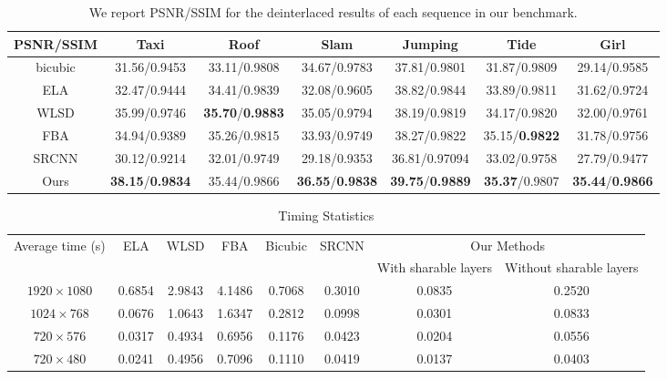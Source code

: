 \begin{table*}
	\center
	\begin{tabular}{|c|c|c|c|c|c|c|}
		\hline
		PSNR/SSIM & Taxi         & Roof & Slam & Jumping      & Tide  &   Girl \\\hline
		bicubic & 31.56/0.9453          & 33.11/0.9808      &34.67/0.9783          &37.81/0.9801    		 &31.87/0.9809                   & 29.14/0.9585  \\  \hline
		ELA     & 32.47/0.9444          & 34.41/0.9839      &32.08/0.9605             &38.82/0.9844             &33.89/0.9811                 & 31.62/0.9724  \\ \hline
		WLSD    & 35.99/0.9746          & \textbf{35.70}/\textbf{0.9883}      &35.05/0.9794    &38.19/0.9819             &34.17/0.9820                 & 32.00/0.9761 \\ \hline
		FBA     & 34.94/0.9389          & 35.26/0.9815      &33.93/0.9749             &38.27/0.9822             &35.15/\textbf{0.9822}                 & 31.78/0.9756  \\ \hline
		SRCNN   & 30.12/0.9214          & 32.01/0.9749      &29.18/0.9353             &36.81/0.97094             &33.02/0.9758                 & 27.79/0.9477  \\ \hline
		Ours    &\textbf{38.15}/\textbf{0.9834}  & 35.44/0.9866   & \textbf{36.55}/\textbf{0.9838}         &\textbf{39.75}/\textbf{0.9889}    &\textbf{35.37}/0.9807      & \textbf{35.44}/\textbf{0.9866} \\ \hline
	\end{tabular}
	\caption{We report PSNR/SSIM for the deinterlaced results of each sequence in our benchmark.}
	\label{tab:psnr_comparsion}
\end{table*}

\begin{table*}[!tp]
	\center
	\begin{tabular}{|c|c|c|c|c|c|c|c|}\hline
		\multirow{2}{*}{Average time (s)} & \multirow{2}{*}{ELA} &\multirow{2}{*}{WLSD} &\multirow{2}{*}{FBA} & \multirow{2}{*}{Bicubic} & \multirow{2}{*}{SRCNN} &  \multicolumn{2}{c|}{Our Methods} \\ \cline{7-8}
		& & & & & & With sharable layers & Without sharable layers\\ \hline
		$1920\times 1080$ & 0.6854  &2.9843  &4.1486 &0.7068 &0.3010 & 0.0835 & 0.2520\\ \hline
		$1024\times 768$  & 0.0676  &1.0643  &1.6347 &0.2812 &0.0998 & 0.0301 & 0.0833\\ \hline
		$720\times 576$   & 0.0317  &0.4934  &0.6956 &0.1176 &0.0423 & 0.0204 & 0.0556\\ \hline
		$720\times 480$   & 0.0241  &0.4956  &0.7096 &0.1110 &0.0419 & 0.0137 & 0.0403\\ \hline
	\end{tabular}
	\caption{Timing Statistics}
	\label{tab:time_statistics}
\end{table*}

